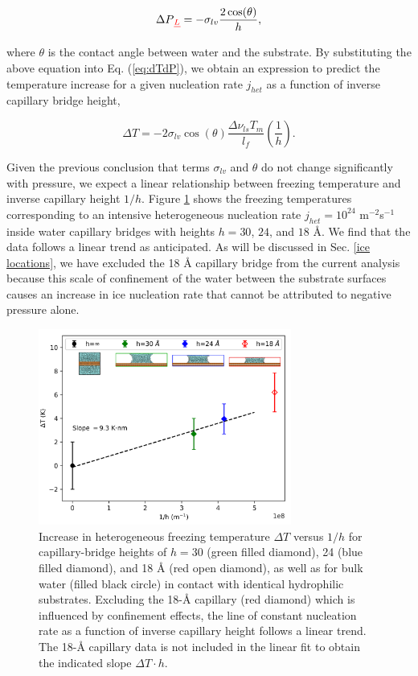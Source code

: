 \documentclass[journal abbreviation, manuscript]{copernicus}
\providecommand{\DIFdel}[1]{{\protect\color{red}\sout{#1}}}                      %
\providecommand{\DIFdelbegin}{} %
\providecommand{\DIFdelend}{} %
\begin{document}
\begin{equation} \label{eq:dPh}
   \Delta P \DIFdelbegin \DIFdel{_{L} }\DIFdelend = -\sigma_{lv} \frac{2\cos(\theta)}{h},
\end{equation}

\noindent where $\theta$ is the contact angle between water and the substrate. By substituting the above equation into Eq. (\ref{eq:dTdP}), we obtain an expression to predict the temperature increase for a given nucleation rate $j_{het}$ as a function of inverse capillary bridge height,  

\begin{equation}\label{eq:dTh}
     \Delta T = -2 \sigma_{lv}\cos(\theta) \frac{\Delta \nu_{ls} T_m }{l_f} \left(\frac{1}{h}\right).
\end{equation}

\noindent Given the previous conclusion that terms $\sigma_{lv}$ and $\theta$ do not change significantly with pressure, we expect a linear relationship between freezing temperature and inverse capillary height $1/h$. Figure \ref{fig:capillary} shows the freezing temperatures corresponding to an intensive heterogeneous nucleation rate $j_{het} = 10^{24}$ m$^{-2}$s$^{-1}$ inside water capillary bridges with heights $h = 30$, $24$, and $18$ \AA{}. We find that the data follows a linear trend as anticipated. As will be discussed in Sec. \ref{ice locations}, we have excluded the 18 \AA{} capillary bridge from the current analysis because this scale of confinement of the water between the substrate surfaces causes an increase in ice nucleation rate that cannot be attributed to negative pressure alone.

\begin{figure}[t]
\includegraphics[width=8.3cm]{figures/TvH_inset.png}
\caption{Increase in heterogeneous freezing temperature $\Delta T$ versus $1/h$ for capillary-bridge heights of $h = 30$ (green filled diamond), 24 (blue filled diamond), and 18 \AA{} (red open diamond), as well as for bulk water (filled black circle) in contact with identical hydrophilic substrates. Excluding the 18-\AA{} capillary (red diamond) which is influenced by confinement effects, the line of constant nucleation rate as a function of inverse capillary height follows a linear trend. The 18-\AA{} capillary data is not included in the linear fit to obtain the indicated slope $\Delta T \cdot h$.}
    \label{fig:capillary}
\end{figure}
\end{document}
